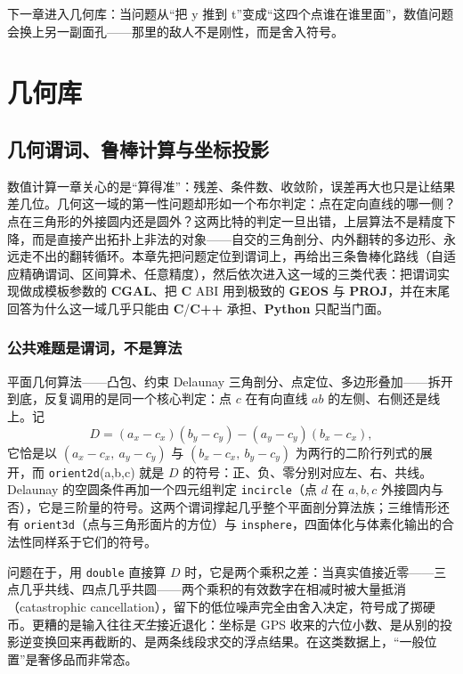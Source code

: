 \documentclass[12pt,a4paper,fontset=fandol]{ctexbook}
\newcommand{\Tp}[1]{\texttt{#1}}
\newcommand{\Bk}{\allowbreak}
\newcommand{\Lib}[1]{\textbf{#1}}
\newcommand{\Lang}[1]{\textsf{\bfseries #1}}
\newcommand{\CL}{\Lang{C}}
\newcommand{\CPP}{\Lang{C++}}
\newcommand{\PY}{\Lang{Python}}
\begin{document}
下一章进入几何库：当问题从``把 y 推到 t''变成``这四个点谁在谁里面''，数值问题会换上另一副面孔——那里的敌人不是刚性，而是舍入符号。

\part{几何库}

\chapter{几何谓词、鲁棒计算与坐标投影}

数值计算一章关心的是``算得准''：残差、条件数、收敛阶，误差再大也只是让结果差几位。几何这一域的第一性问题却形如一个布尔判定：点在定向直线的哪一侧？点在三角形的外接圆内还是圆外？这两比特的判定一旦出错，上层算法不是精度下降，而是直接产出拓扑上非法的对象——自交的三角剖分、内外翻转的多边形、永远走不出的翻转循环。本章先把问题定位到谓词上，再给出三条鲁棒化路线（自适应精确谓词、区间算术、任意精度），然后依次进入这一域的三类代表：把谓词实现做成模板参数的 \Lib{CGAL}、把 \CL{} ABI 用到极致的 \Lib{GEOS} 与 \Lib{PROJ}，并在末尾回答为什么这一域几乎只能由 \CL/{\Bk}\CPP{} 承担、\PY{} 只配当门面。

\section{公共难题是谓词，不是算法}

平面几何算法——凸包、约束 Delaunay 三角剖分、点定位、多边形叠加——拆开到底，反复调用的是同一个核心判定：点 $c$ 在有向直线 $ab$ 的左侧、右侧还是线上。记
\[
  D=(a_x-c_x)(b_y-c_y)-(a_y-c_y)(b_x-c_x),
\]
它恰是以 $(a_x-c_x,\ a_y-c_y)$ 与 $(b_x-c_x,\ b_y-c_y)$ 为两行的二阶行列式的展开，而 \Tp{orient2d}(a,b,c) 就是 $D$ 的符号：正、负、零分别对应左、右、共线。Delaunay 的空圆条件再加一个四元组判定 \Tp{incircle}（点 $d$ 在 $a,b,c$ 外接圆内与否），它是三阶量的符号。这两个谓词撑起几乎整个平面剖分算法族；三维情形还有 \Tp{orient3d}（点与三角形面片的方位）与 \Tp{insphere}，四面体化与体素化输出的合法性同样系于它们的符号。

问题在于，用 \Tp{double} 直接算 $D$ 时，它是两个乘积之差：当真实值接近零——三点几乎共线、四点几乎共圆——两个乘积的有效数字在相减时被大量抵消（catastrophic cancellation），留下的低位噪声完全由舍入决定，符号成了掷硬币。更糟的是输入往往\emph{天生}接近退化：坐标是 GPS 收来的六位小数、是从别的投影逆变换回来再截断的、是两条线段求交的浮点结果。在这类数据上，``一般位置''是奢侈品而非常态。
\end{document}
